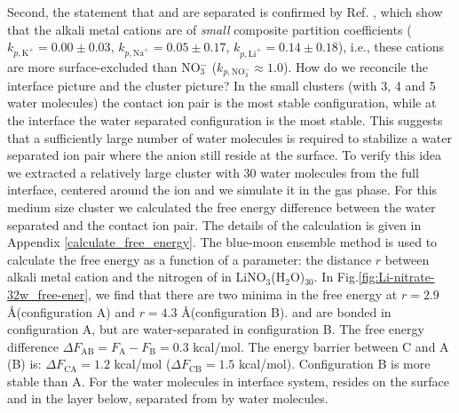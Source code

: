 Second, the statement that \Li and \nitrate are separated is confirmed by Ref. \cite{Pegram06,Pegram08},
which show that the alkali metal cations are of \emph{small}
composite partition coefficients ($k_{p,\text{K}^+} = 0.00\pm 0.03$, $k_{p,\text{Na}^+} = 0.05\pm 0.17$, $k_{p,\text{Li}^+} = 0.14\pm 0.18$), i.e., 
these cations are more surface-excluded than 
NO$_3^-$ ($k_{p,\text{NO}_3^-} \approx 1.0$).
How do we reconcile the interface picture and the cluster picture?
In the small clusters (with 3, 4 and 5 water molecules) the contact ion pair is the most stable configuration, 
while at the interface the water separated configuration is the most stable.
This suggests that a sufficiently large number of water molecules is required to stabilize a water separated ion pair where
the \nitrate anion still reside at the surface. 
To verify this idea we extracted a relatively large cluster with 30 water molecules from the full interface, centered
around the \Li ion and we simulate it in the gas phase. 
For this medium size cluster we calculated the free energy difference between the
water separated and the contact ion pair. The details of the calculation is given in Appendix \ref{calculate_free_energy}. 
The blue-moon ensemble method \cite{CCHK89,Sprik98,Tuckerman10} is used to calculate the free energy as a function of a parameter: 
the distance $r$ between alkali metal cation and the nitrogen of \nitrate in LiNO$_3$(H$_2$O)$_{30}$.
In Fig.\space\ref{fig:Li-nitrate-32w_free-ener}, we find that there are two minima in the free energy
at $r=2.9$ \AA (configuration A)  and $r=4.3$ \AA(configuration B).
\Li and \nitrate are bonded in configuration A, but are water-separated in configuration B.
The free energy difference $\Delta{F}_{\text{AB}}=F_{\text{A}}-F_{\text{B}} = 0.3$ kcal/mol. 
The energy barrier between C and A (B) is:
$\Delta{F_{\text{CA}}} = 1.2$ kcal/mol ($\Delta F_{\text{CB}} = 1.5$ kcal/mol). Configuration B is more stable than A.
For the water molecules in interface system, \nitrate resides on the surface and \Li in the layer below, separated from \nitrate by water molecules.
